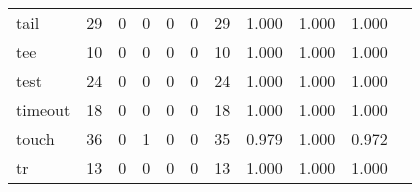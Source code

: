 \begin{longtable}{lp{1.20cm}p{1.20cm}p{1.20cm}p{1.20cm}p{1.20cm}p{1.20cm}p{1.20cm}p{1.20cm}p{1.20cm}p{1.20cm}}
tail      &                                    29 &                                                  0 &                                                  0 &                                                  0 &                                                  0 &                                                 29 &                                         1.000 &                                              1.000 &                                              1.000 \\
tee       &                                    10 &                                                  0 &                                                  0 &                                                  0 &                                                  0 &                                                 10 &                                         1.000 &                                              1.000 &                                              1.000 \\
test      &                                    24 &                                                  0 &                                                  0 &                                                  0 &                                                  0 &                                                 24 &                                         1.000 &                                              1.000 &                                              1.000 \\
timeout   &                                    18 &                                                  0 &                                                  0 &                                                  0 &                                                  0 &                                                 18 &                                         1.000 &                                              1.000 &                                              1.000 \\
touch     &                                    36 &                                                  0 &                                                  1 &                                                  0 &                                                  0 &                                                 35 &                                         0.979 &                                              1.000 &                                              0.972 \\
tr        &                                    13 &                                                  0 &                                                  0 &                                                  0 &                                                  0 &                                                 13 &                                         1.000 &                                              1.000 &                                              1.000 \\

\end{longtable}
